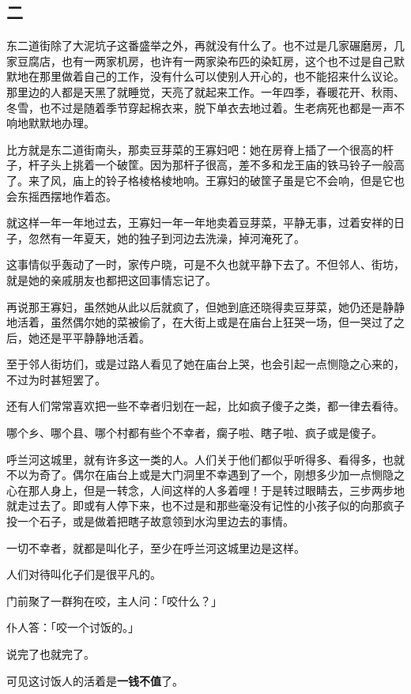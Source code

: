 \documentclass[UTF8]{ctexart}
\begin{document}
\subsection{二}

东二道街除了大泥坑子这番盛举之外，再就没有什么了。也不过是几家碾磨房，几家豆腐店，也有一两家机房，也许有一两家染布匹的染缸房，这个也不过是自己默默地在那里做着自己的工作，没有什么可以使别人开心的，也不能招来什么议论。那里边的人都是天黑了就睡觉，天亮了就起来工作。一年四季，春暖花开、秋雨、冬雪，也不过是随着季节穿起棉衣来，脱下单衣去地过着。生老病死也都是一声不响地默默地办理。

比方就是东二道街南头，那卖豆芽菜的王寡妇吧：她在房脊上插了一个很高的杆子，杆子头上挑着一个破筐。因为那杆子很高，差不多和龙王庙的铁马铃子一般高了。来了风，庙上的铃子格棱格棱地响。王寡妇的破筐子虽是它不会响，但是它也会东摇西摆地作着态。

就这样一年一年地过去，王寡妇一年一年地卖着豆芽菜，平静无事，过着安祥的日子，忽然有一年夏天，她的独子到河边去洗澡，掉河淹死了。

这事情似乎轰动了一时，家传户晓，可是不久也就平静下去了。不但邻人、街坊，就是她的亲戚朋友也都把这回事情忘记了。

再说那王寡妇，虽然她从此以后就疯了，但她到底还晓得卖豆芽菜，她仍还是静静地活着，虽然偶尔她的菜被偷了，在大街上或是在庙台上狂哭一场，但一哭过了之后，她还是平平静静地活着。

至于邻人街坊们，或是过路人看见了她在庙台上哭，也会引起一点恻隐之心来的，不过为时甚短罢了。

还有人们常常喜欢把一些不幸者归划在一起，比如疯子傻子之类，都一律去看待。

哪个乡、哪个县、哪个村都有些个不幸者，瘸子啦、瞎子啦、疯子或是傻子。

呼兰河这城里，就有许多这一类的人。人们关于他们都似乎听得多、看得多，也就不以为奇了。偶尔在庙台上或是大门洞里不幸遇到了一个，刚想多少加一点恻隐之心在那人身上，但是一转念，人间这样的人多着哩！于是转过眼睛去，三步两步地就走过去了。即或有人停下来，也不过是和那些毫没有记性的小孩子似的向那疯子投一个石子，或是做着把瞎子故意领到水沟里边去的事情。

一切不幸者，就都是叫化子，至少在呼兰河这城里边是这样。

人们对待叫化子们是很平凡的。

门前聚了一群狗在咬，主人问：「咬什么？」

仆人答：「咬一个讨饭的。」

说完了也就完了。

可见这讨饭人的活着是\textbf{一钱不值}了。
\end{document}
